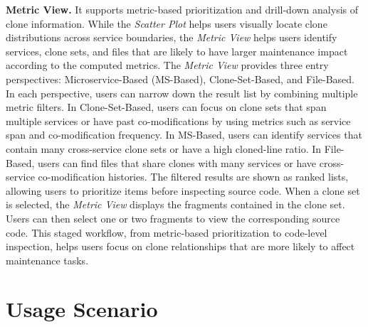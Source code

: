 \documentclass[conference]{IEEEtran}
\begin{document}
\smallskip\noindent\textbf{Metric View.}
It supports metric-based prioritization and drill-down
analysis of clone information. While the \emph{Scatter Plot} helps users
visually locate clone distributions across service boundaries, the
\emph{Metric View} helps users identify services, clone sets, and files that
are likely to have larger maintenance impact according to the computed
metrics.
The \emph{Metric View} provides three entry perspectives: Microservice-Based
(MS-Based), Clone-Set-Based, and File-Based. In each perspective, users
can narrow down the result list by combining multiple metric filters.
In Clone-Set-Based, users can focus on clone sets that span multiple
services or have past co-modifications by using metrics such as service
span and co-modification frequency. In MS-Based, users can identify
services that contain many cross-service clone sets or have a high
cloned-line ratio. In File-Based, users can find files that share clones
with many services or have cross-service co-modification histories.
The filtered results are shown as ranked lists, allowing users to
prioritize items before inspecting source code. When a clone set is
selected, the \emph{Metric View} displays the fragments contained in the
clone set. Users can then select one or two fragments to view the
corresponding source code. This staged workflow, from metric-based
prioritization to code-level inspection, helps users focus on clone
relationships that are more likely to affect maintenance tasks.



\section{Usage Scenario}
\label{sec:scenario-impact}
\end{document}
